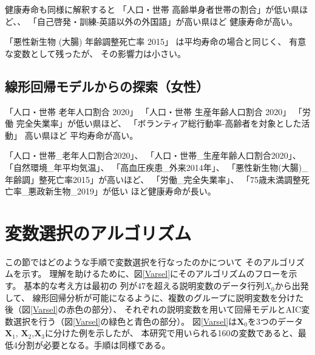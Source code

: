 \documentclass[a4j,11pt,mc]{jreport}
\begin{document}

健康寿命も同様に解釈すると
「人口・世帯 高齢単身者世帯の割合」が低い県ほど、、
「自己啓発・訓練-英語以外の外国語」が高い県ほど
健康寿命が高い。

「悪性新生物 (大腸) 年齢調整死亡率 2015」
は平均寿命の場合と同じく、
有意な変数として残ったが、
その影響力は小さい。


\subsection{線形回帰モデルからの探索（女性）}

「人口・世帯 老年人口割合 2020」
「人口・世帯 生産年齢人口割合 2020」
「労働 完全失業率」が低い県ほど、
「ボランティア総行動率-高齢者を対象とした活動」
高い県ほど
平均寿命が高い。



「人口・世帯\_老年人口割合2020」、
「人口・世帯\_生産年齢人口割合2020」、
「自然環境\_年平均気温」、
「高血圧疾患\_外来2014年」、
「悪性新生物(大腸)\_年齢調」整死亡率2015」が高いほど、
「労働\_完全失業率」、
「75歳未満調整死亡率\_悪政新生物\_2019」が低い
ほど健康寿命が長い。











\section{変数選択のアルゴリズム}




この節ではどのような手順で変数選択を行なったのかについて
そのアルゴリズムを示す。
理解を助けるために、図\ref{Varsel}にそのアルゴリズムのフローを示す。
基本的な考え方は最初の
列が47を超える説明変数のデータ行列$X_0$から出発して、
線形回帰分析が可能になるように、複数のグループに説明変数を分けた後（図\ref{Varsel}の赤色の部分）、
それぞれの説明変数を用いて回帰モデルとAIC変数選択を行う（図\ref{Varsel}の緑色と青色の部分）。
図\ref{Varsel}は$\bm{X}_0$を3つのデータ$\bm{X}_1$, $\bm{X}_2$,$\bm{X}_3$に分けた例を示したが、
本研究で用いられる160の変数であると、最低4分割が必要となる。手順は同様である。
\end{document}
